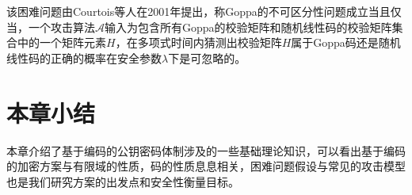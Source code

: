 \begin{define}[Goppa码的不可区分性问题]
	该困难问题由Courtois等人在2001年提出，称Goppa的不可区分性问题成立当且仅当，一个攻击算法$\mathcal{A}$输入为包含所有Goppa的校验矩阵和随机线性码的校验矩阵集合中的一个矩阵元素$H$，在多项式时间内猜测出校验矩阵$H$属于Goppa码还是随机线性码的正确的概率在安全参数$\lambda$下是可忽略的。
\end{define}
\section{本章小结}
本章介绍了基于编码的公钥密码体制涉及的一些基础理论知识，可以看出基于编码的加密方案与有限域的性质，码的性质息息相关，困难问题假设与常见的攻击模型也是我们研究方案的出发点和安全性衡量目标。